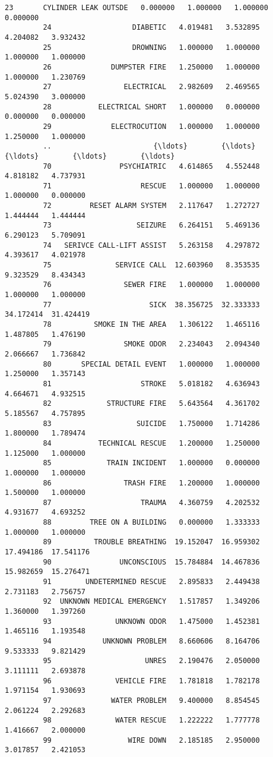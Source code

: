 \documentclass[11pt]{article}
\begin{document}
\begin{Verbatim}[commandchars=\\\{\}]
         23       CYLINDER LEAK OUTSDE   0.000000   1.000000   1.000000   0.000000   
         24                   DIABETIC   4.019481   3.532895   4.204082   3.932432   
         25                   DROWNING   1.000000   1.000000   1.000000   1.000000   
         26              DUMPSTER FIRE   1.250000   1.000000   1.000000   1.230769   
         27                 ELECTRICAL   2.982609   2.469565   5.024390   3.000000   
         28           ELECTRICAL SHORT   1.000000   0.000000   0.000000   0.000000   
         29              ELECTROCUTION   1.000000   1.000000   1.250000   1.000000   
         ..                        {\ldots}        {\ldots}        {\ldots}        {\ldots}        {\ldots}   
         70                PSYCHIATRIC   4.614865   4.552448   4.818182   4.737931   
         71                     RESCUE   1.000000   1.000000   1.000000   0.000000   
         72         RESET ALARM SYSTEM   2.117647   1.272727   1.444444   1.444444   
         73                    SEIZURE   6.264151   5.469136   6.290123   5.709091   
         74   SERIVCE CALL-LIFT ASSIST   5.263158   4.297872   4.393617   4.021978   
         75               SERVICE CALL  12.603960   8.353535   9.323529   8.434343   
         76                 SEWER FIRE   1.000000   1.000000   1.000000   1.000000   
         77                       SICK  38.356725  32.333333  34.172414  31.424419   
         78          SMOKE IN THE AREA   1.306122   1.465116   1.487805   1.476190   
         79                 SMOKE ODOR   2.234043   2.094340   2.066667   1.736842   
         80       SPECIAL DETAIL EVENT   1.000000   1.000000   1.250000   1.357143   
         81                     STROKE   5.018182   4.636943   4.664671   4.932515   
         82             STRUCTURE FIRE   5.643564   4.361702   5.185567   4.757895   
         83                    SUICIDE   1.750000   1.714286   1.800000   1.789474   
         84           TECHNICAL RESCUE   1.200000   1.250000   1.125000   1.000000   
         85             TRAIN INCIDENT   1.000000   0.000000   1.000000   1.000000   
         86                 TRASH FIRE   1.200000   1.000000   1.500000   1.000000   
         87                     TRAUMA   4.360759   4.202532   4.931677   4.693252   
         88         TREE ON A BUILDING   0.000000   1.333333   1.000000   1.000000   
         89          TROUBLE BREATHING  19.152047  16.959302  17.494186  17.541176   
         90                UNCONSCIOUS  15.784884  14.467836  15.982659  15.276471   
         91        UNDETERMINED RESCUE   2.895833   2.449438   2.731183   2.756757   
         92  UNKNOWN MEDICAL EMERGENCY   1.517857   1.349206   1.360000   1.397260   
         93               UNKNOWN ODOR   1.475000   1.452381   1.465116   1.193548   
         94            UNKNOWN PROBLEM   8.660606   8.164706   9.533333   9.821429   
         95                      UNRES   2.190476   2.050000   3.111111   2.693878   
         96               VEHICLE FIRE   1.781818   1.782178   1.971154   1.930693   
         97              WATER PROBLEM   9.400000   8.854545   2.061224   2.292683   
         98               WATER RESCUE   1.222222   1.777778   1.416667   2.000000   
         99                  WIRE DOWN   2.185185   2.950000   3.017857   2.421053   
         

\end{Verbatim}
\end{document}
